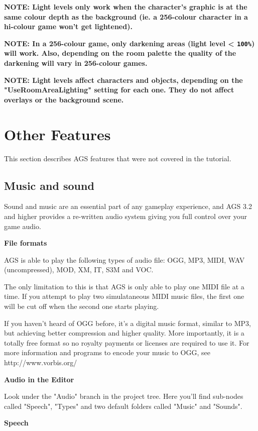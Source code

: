 \bf{NOTE:} Light levels only work when the character's graphic is at the same
colour depth as the background (ie. a 256-colour character in a hi-colour
game won't get lightened).

\bf{NOTE:} In a 256-colour game, only darkening areas (light level < \verb$100%$) will work.
Also, depending on the room palette the quality of the darkening will vary
in 256-colour games.

\bf{NOTE:} Light levels affect characters and objects, depending on
the "UseRoomAreaLighting" setting for each one.
They do not affect overlays or the background scene.


\chapter{Other Features}%

This section describes AGS features that were not covered in the tutorial.

\section{Music and sound}\label{MusAndSound}%

Sound and music are an essential part of any gameplay experience, and AGS 3.2 and higher
provides a re-written audio system giving you full control over your game audio.

\bf{File formats}

AGS is able to play the following types of audio file: OGG, MP3, MIDI, WAV (uncompressed),
MOD, XM, IT, S3M and VOC.

The only limitation to this is that AGS is only able to play one MIDI file at a time.
If you attempt to play two simulataneous MIDI music files, the first one will be cut
off when the second one starts playing.

If you haven't heard of OGG before, it's a digital music format, similar to MP3, but achieving
better compression and higher quality. More importantly, it is a totally free format
so no royalty payments or licenses are required to use it. For more information and
programs to encode your music to OGG, see http://www.vorbis.org/

\bf{Audio in the Editor}

Look under the "Audio" branch in the project tree. Here you'll find sub-nodes called
"Speech", "Types" and two default folders called "Music" and "Sounds".

\bf{Speech}

